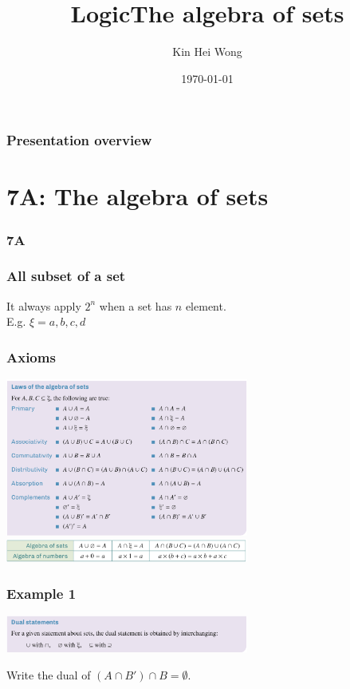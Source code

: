 \documentclass[
	11pt, %
]{beamer}
\title{Logic}
\author{Kin Hei Wong}
\date{\today}
\begin{document}
\begin{frame}
    \titlepage
\end{frame}

\begin{frame}
    \frametitle{Presentation overview}
    \tableofcontents
\end{frame}
\section{7A: The algebra of sets}
\begin{frame}
    \frametitle{7A}
    \begin{center}
        \title{The algebra of sets}
        \maketitle
    \end{center}
\end{frame}

\begin{frame}[t]
    \frametitle{All subset of a set}
    It always apply $2^n$ when a set has $n$ element.\\
    E.g. $\xi = {a, b, c, d}$
\end{frame}


\begin{frame}
    \frametitle{Axioms}
    \begin{center}
        \includegraphics[width = 8cm]{Axioms.png}\\
        \includegraphics[width = 8cm]{Sim.png}
    \end{center}
\end{frame}

\begin{frame}[t]
    \frametitle{Example 1}
    \begin{center}
        \includegraphics[width = 8cm]{Dual.png}
    \end{center}
    Write the dual of $(A \cap B')\cap B = \emptyset$.  
\end{frame}
\end{document}
